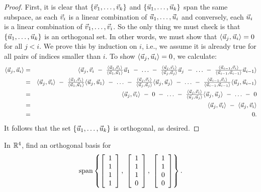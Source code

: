 \documentclass{ximera}
\begin{document}
\begin{proof}
  First, it is clear that $\set{\vect{v}_1,\ldots,\vect{v}_k}$ and
  $\set{\vect{u}_1,\ldots,\vect{u}_k}$ span the same subspace, as each
  $\vect{v}_i$ is a linear combination of
  $\vect{u}_1,\ldots,\vect{u}_i$ and conversely, each $\vect{u}_i$ is
  a linear combination of $\vect{v}_1,\ldots,\vect{v}_i$. So the only
  thing we must check is that $\set{\vect{u}_1,\ldots,\vect{u}_k}$ is
  an orthogonal set. In other words, we must show that
  $\iprod{\vect{u}_j,\vect{u}_i}=0$ for all $j<i$. We prove this by
  induction on $i$, i.e., we assume it is already true for all pairs
  of indices smaller than $i$. To show
  $\iprod{\vect{u}_j,\vect{u}_i}=0$, we calculate:
  \begin{eqnarray*}
    \iprod{\vect{u}_j,\vect{u}_i}
    &=& \textstyle
        \iprod{\vect{u}_j, \vect{v}_i
        ~-~ \frac{\iprod{\vect{u}_1,\vect{v}_i}}{\iprod{\vect{u}_1,\vect{u}_1}}\vect{u}_1
        ~-~ \ldots
        ~-~ \frac{\iprod{\vect{u}_j,\vect{v}_i}}{\iprod{\vect{u}_j,\vect{u}_j}}\vect{u}_j
        ~-~ \ldots
        ~-~ \frac{\iprod{\vect{u}_{i-1},\vect{v}_i}}{\iprod{\vect{u}_{i-1},\vect{u}_{i-1}}}\vect{u}_{i-1}}
    \\
    &=& \textstyle
        \iprod{\vect{u}_j, \vect{v}_i}
        ~-~ \frac{\iprod{\vect{u}_1,\vect{v}_i}}{\iprod{\vect{u}_1,\vect{u}_1}}\iprod{\vect{u}_j,\vect{u}_1}
        ~-~ \ldots
        ~-~ \frac{\iprod{\vect{u}_j,\vect{v}_i}}{\iprod{\vect{u}_j,\vect{u}_j}}\iprod{\vect{u}_j,\vect{u}_j}
        ~-~ \ldots
        ~-~ \frac{\iprod{\vect{u}_{i-1},\vect{v}_i}}{\iprod{\vect{u}_{i-1},\vect{u}_{i-1}}}\iprod{\vect{u}_j,\vect{u}_{i-1}}
    \\
    &=& \textstyle
        \iprod{\vect{u}_j, \vect{v}_i}
        ~-~ 0
        ~-~ \ldots
        ~-~ \frac{\iprod{\vect{u}_j,\vect{v}_i}}{\iprod{\vect{u}_j,\vect{u}_j}}\iprod{\vect{u}_j,\vect{u}_j}
        ~-~ \ldots
        ~-~ 0
    \\
    &=& \iprod{\vect{u}_j, \vect{v}_i}
        ~-~ \iprod{\vect{u}_j,\vect{v}_i}
    \\
    &=& 0.
  \end{eqnarray*}
  It follows that the set $\set{\vect{u}_1,\ldots,\vect{u}_k}$ is
  orthogonal, as desired.
\end{proof}

\begin{example}\label{ex:gram-schmidt-r4}
  In $\R^4$, find an orthogonal basis for
  \begin{equation*}
    \sspan\set{
      \startmat{c} 1 \\ 1 \\ 1 \\ 1 \stopmat,~
      \startmat{c} 1 \\ 1 \\ 1 \\ 0 \stopmat,~
      \startmat{c} 1 \\ 1 \\ 0 \\ 0 \stopmat
    }.
  \end{equation*}
\end{example}
\end{document}
